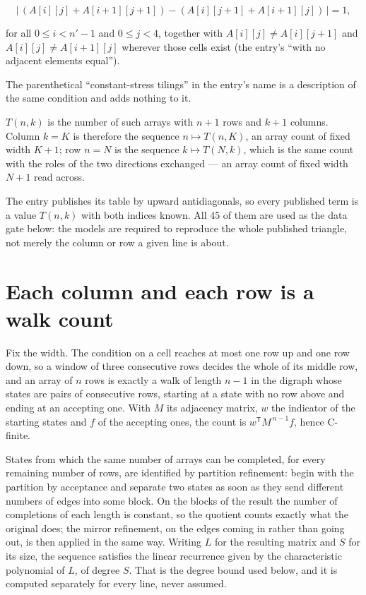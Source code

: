 \documentclass[11pt]{article}
\theoremstyle{definition}
\begin{document}
\[\bigl|\,(A[i][j] + A[i{+}1][j{+}1]) - (A[i][j{+}1] + A[i{+}1][j])\,\bigr| = 1,\]

for all $0 \le i < n'-1$ and $0 \le j < 4$, together with $A[i][j] \ne A[i][j{+}1]$ and $A[i][j] \ne A[i{+}1][j]$ wherever those cells exist (the entry's ``with no adjacent elements equal'').

The parenthetical ``constant-stress tilings'' in the entry's name is a description of the same condition and adds nothing to it.

$T(n,k)$ is the number of such arrays with $n + 1$ rows and $k + 1$ columns. Column $k = K$ is therefore the sequence $n \mapsto T(n,K)$, an array count of fixed width $K + 1$; row $n = N$ is the sequence $k \mapsto T(N,k)$, which is the same count with the roles of the two directions exchanged --- an array count of fixed width $N + 1$ read across.

The entry publishes its table by upward antidiagonals, so every published term is a value $T(n,k)$ with both indices known. All 45 of them are used as the data gate below: the models are required to reproduce the whole published triangle, not merely the column or row a given line is about.

\section{Each column and each row is a walk count}

Fix the width. The condition on a cell reaches at most one row up and one row down, so a window of three consecutive rows decides the whole of its middle row, and an array of $n$ rows is exactly a walk of length $n-1$ in the digraph whose states are pairs of consecutive rows, starting at a state with no row above and ending at an accepting one. With $M$ its adjacency matrix, $w$ the indicator of the starting states and $f$ of the accepting ones, the count is $w^{\mathsf T}M^{\,n-1}f$, hence C-finite.

States from which the same number of arrays can be completed, for every remaining number of rows, are identified by partition refinement: begin with the partition by acceptance and separate two states as soon as they send different numbers of edges into some block. On the blocks of the result the number of completions of each length is constant, so the quotient counts exactly what the original does; the mirror refinement, on the edges coming in rather than going out, is then applied in the same way. Writing $L$ for the resulting matrix and $S$ for its size, the sequence satisfies the linear recurrence given by the characteristic polynomial of $L$, of degree $S$. That is the degree bound used below, and it is computed separately for every line, never assumed.
\end{document}
